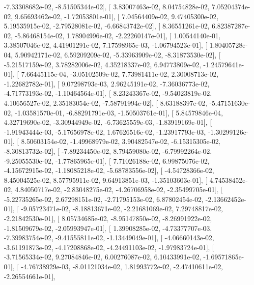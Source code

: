 \documentclass{article}
\begin{document}
         -7.33308682e-02,  -8.51505344e-02],
       [  3.83007463e-02,   8.04754828e-02,   7.05204374e-02,
          9.65693462e-02,  -1.72053801e-01],
       [  7.04564409e-02,   9.47405300e-02,   5.19535915e-02,
         -2.79528081e-02,  -6.66843742e-02],
       [  8.36551261e-02,   6.82387287e-02,  -5.86468154e-02,
          1.78904996e-02,  -2.22260147e-01],
       [  1.00544140e-01,   3.38507046e-02,   4.41901291e-02,
          7.17598965e-03,  -1.06794523e-01],
       [  1.80405728e-04,   5.90942171e-02,   6.59209209e-02,
         -5.33963909e-02,  -8.31873530e-02],
       [ -5.21517159e-02,   3.78282006e-02,   4.35218337e-02,
          6.94773809e-02,  -1.24579641e-01],
       [  7.66445115e-04,  -3.05102509e-02,   7.73981411e-02,
          2.30008713e-02,  -1.22682782e-01],
       [  9.07298793e-03,   2.96245191e-02,  -7.36036773e-02,
         -4.71773193e-02,  -1.10464564e-01],
       [  8.23243367e-02,  -9.54023819e-02,   4.10656527e-02,
          2.35183054e-02,  -7.58791994e-02],
       [  8.63188397e-02,  -5.47151630e-02,  -1.03581570e-01,
         -6.88291791e-03,  -1.50503761e-01],
       [  5.84579846e-04,   4.32719690e-02,  -3.30944949e-02,
         -6.73625559e-03,  -1.83919169e-01],
       [ -1.91943444e-03,  -5.17656978e-02,   1.67626516e-02,
         -1.23917793e-03,  -1.30299126e-01],
       [  8.50603154e-02,  -1.49968979e-02,   3.90482547e-02,
         -6.15315305e-02,  -8.30813732e-02],
       [ -7.89234450e-02,   8.79459080e-02,  -6.79992264e-02,
         -9.25055530e-02,  -1.77865965e-01],
       [  7.71026188e-02,   6.99875076e-02,  -4.15672915e-02,
         -1.18085218e-02,  -5.68783556e-02],
       [ -4.54728366e-02,   8.45004525e-02,   8.57795911e-02,
          9.64913851e-03,  -1.35103603e-01],
       [  4.74538452e-02,   4.84050717e-02,  -2.83048275e-02,
         -4.26706958e-02,  -2.35499705e-01],
       [ -5.22735265e-02,   2.67298151e-02,  -2.71795153e-02,
          6.87802454e-02,  -2.13662452e-01],
       [ -9.05723471e-02,  -8.18813671e-02,  -2.21681069e-02,
          7.29748817e-02,  -2.21842530e-01],
       [  8.05734685e-02,  -8.95147850e-02,  -8.26991922e-02,
         -1.81509679e-02,  -2.05993947e-01],
       [  1.39908285e-02,  -4.73377707e-03,  -7.39983754e-02,
         -9.41555811e-02,  -1.13449049e-01],
       [ -4.06660143e-02,  -3.61191873e-02,  -4.17208868e-02,
         -4.24491103e-02,  -1.97983724e-01],
       [ -3.71565334e-02,   9.27084846e-02,   6.00276087e-02,
          6.10433991e-02,  -1.69571865e-01],
       [ -4.76738929e-03,  -8.01121034e-02,   1.81993772e-02,
         -2.47410611e-02,  -2.26554661e-01],
\end{document}
